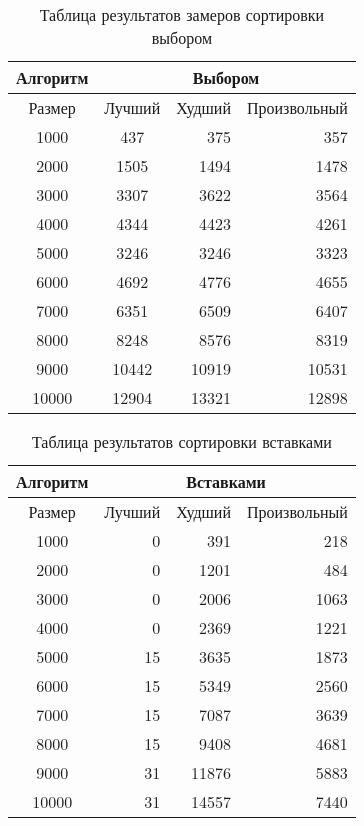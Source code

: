 \begin{table}
		\label{tab:1}
		\caption{Таблица результатов замеров сортировки выбором}
		\begin{tabular}{|c|c|r|r|}
			\hline
			Алгоритм  &       \multicolumn{ 3}{|c|}{Выбором} \\
			\hline
			Размер &     Лучший &     Худший & Произвольный \\
			\hline
			1000 &        437 &        375 &        357 \\
			\hline
			2000 &       1505 &       1494 &       1478 \\
			\hline
			3000 &       3307 &       3622 &       3564 \\
			\hline
			4000 &       4344 &       4423 &       4261 \\
			\hline
			5000 &       3246 &       3246 &       3323 \\
			\hline
			6000 &       4692 &       4776 &       4655 \\
			\hline
			7000 &       6351 &       6509 &       6407 \\
			\hline
			8000 &       8248 &       8576 &       8319 \\
			\hline
			9000 &      10442 &      10919 &      10531 \\
			\hline
			10000 &      12904 &      13321 &      12898 \\
			\hline
		\end{tabular}
	\end{table}

	\begin{table}
		\label{tab:2}
		\caption{Таблица результатов сортировки вставками}
		\begin{tabular}{|c|r|r|r|}
			\hline
			Алгоритм  &     \multicolumn{ 3}{|c|}{Вставками} \\
			\hline
			Размер &     Лучший &     Худший & Произвольный \\
			\hline
			1000 &          0 &        391 &        218 \\
			\hline
			2000 &          0 &       1201 &        484 \\
			\hline
			3000 &          0 &       2006 &       1063 \\
			\hline
			4000 &          0 &       2369 &       1221 \\
			\hline
			5000 &         15 &       3635 &       1873 \\
			\hline
			6000 &         15 &       5349 &       2560 \\
			\hline
			7000 &         15 &       7087 &       3639 \\
			\hline
			8000 &         15 &       9408 &       4681 \\
			\hline
			9000 &         31 &      11876 &       5883 \\
			\hline
			10000 &         31 &      14557 &       7440 \\
			\hline
		\end{tabular}  
	\end{table}


